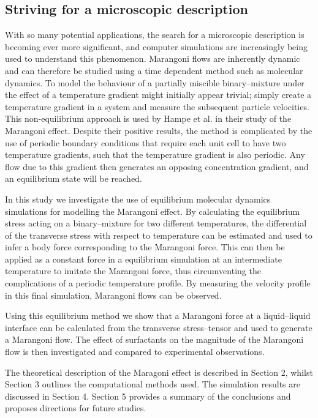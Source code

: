 \subsection{Striving for a microscopic description}
With so many potential applications, the search for a microscopic description is becoming ever more significant, and computer simulations are increasingly being used to understand this phenomenon.
Marangoni flows are inherently dynamic and can therefore be studied using a time dependent method such as molecular dynamics.
To model the behaviour of a partially miscible binary--mixture under the effect of a temperature gradient might initially appear trivial; simply create a temperature gradient in a system and measure the subsequent particle velocities.
This non-equilibrium approach is used by Hampe et al. in their study of the Marangoni effect.\cite{HolgerBoppHampe}
Despite their positive results, the method is complicated by the use of periodic boundary conditions that require each unit cell to have two temperature gradients, such that the temperature gradient is also periodic.
Any flow due to this gradient then generates an opposing concentration gradient, and an equilibrium state will be reached.

In this study we investigate the use of equilibrium molecular dynamics simulations for modelling the Marangoni effect.
By calculating the equilibrium stress acting on a binary--mixture for two different temperatures, the differential of the transverse stress with respect to temperature can be estimated and used to infer a body force corresponding to the Marangoni force.
This can then be applied as a constant force in a equilibrium simulation at an intermediate temperature to imitate the Marangoni force, thus circumventing the complications of a periodic temperature profile.
By measuring the velocity profile in this final simulation, Marangoni flows can be observed.

Using this equilibrium method we show that a Marangoni force at a liquid--liquid interface can be calculated from the transverse stress--tensor and used to generate a Marangoni flow.
The effect of surfactants on the magnitude of the Marangoni flow is then investigated and compared to experimental observations.

The theoretical description of the Maragoni effect is described in Section 2, whilst Section 3 outlines the computational methods used.
The simulation results are discussed in Section 4.
Section 5 provides a summary of the conclusions and proposes directions for future studies.
